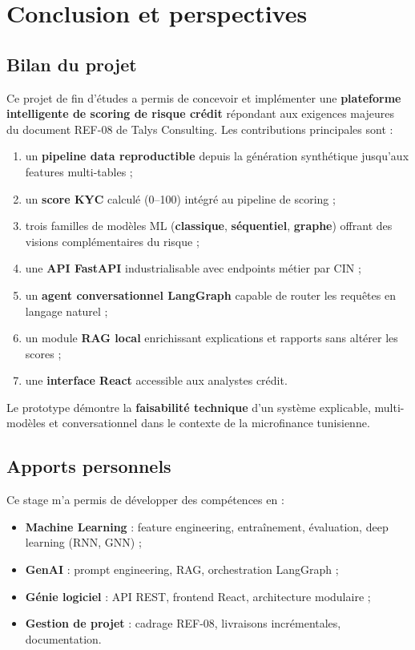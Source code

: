 \chapter{Conclusion et perspectives}
\label{ch:conclusion}

\section{Bilan du projet}

Ce projet de fin d'études a permis de concevoir et implémenter une \textbf{plateforme intelligente de scoring de risque crédit} répondant aux exigences majeures du document REF-08 de Talys Consulting. Les contributions principales sont :

\begin{enumerate}[leftmargin=*]
  \item un \textbf{pipeline data reproductible} depuis la génération synthétique jusqu'aux features multi-tables ;
  \item un \textbf{score KYC} calculé (0--100) intégré au pipeline de scoring ;
  \item trois familles de modèles ML (\textbf{classique}, \textbf{séquentiel}, \textbf{graphe}) offrant des visions complémentaires du risque ;
  \item une \textbf{API FastAPI} industrialisable avec endpoints métier par CIN ;
  \item un \textbf{agent conversationnel LangGraph} capable de router les requêtes en langage naturel ;
  \item un module \textbf{RAG local} enrichissant explications et rapports sans altérer les scores ;
  \item une \textbf{interface React} accessible aux analystes crédit.
\end{enumerate}

Le prototype démontre la \textbf{faisabilité technique} d'un système explicable, multi-modèles et conversationnel dans le contexte de la microfinance tunisienne.

\section{Apports personnels}

Ce stage m'a permis de développer des compétences en :
\begin{itemize}[leftmargin=*]
  \item \textbf{Machine Learning} : feature engineering, entraînement, évaluation, deep learning (RNN, GNN) ;
  \item \textbf{GenAI} : prompt engineering, RAG, orchestration LangGraph ;
  \item \textbf{Génie logiciel} : API REST, frontend React, architecture modulaire ;
  \item \textbf{Gestion de projet} : cadrage REF-08, livraisons incrémentales, documentation.
\end{itemize}

